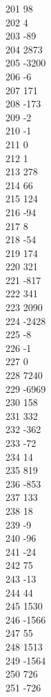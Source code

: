 { 201	98 \\
 202	4 \\
 203	-89 \\
 204	2873 \\
 205	-3200 \\
 206	-6 \\
 207	171 \\
 208	-173 \\
 209	-2 \\
 210	-1 \\
 211	0 \\
 212	1 \\
 213	278 \\
 214	66 \\
 215	124 \\
 216	-94 \\
 217	8 \\
 218	-54 \\
 219	174 \\
 220	321 \\
 221	-817 \\
 222	341 \\
 223	2090 \\
 224	-2428 \\
 225	-8 \\
 226	-1 \\
 227	0 \\
 228	7240 \\
 229	-6969 \\
 230	158 \\
 231	332 \\
 232	-362 \\
 233	-72 \\
 234	14 \\
 235	819 \\
 236	-853 \\
 237	133 \\
 238	18 \\
 239	-9 \\
 240	-96 \\
 241	-24 \\
 242	75 \\
 243	-13 \\
 244	44 \\
 245	1530 \\
 246	-1566 \\
 247	55 \\
 248	1513 \\
 249	-1564 \\
 250	726 \\
 251	-726 \\
}
